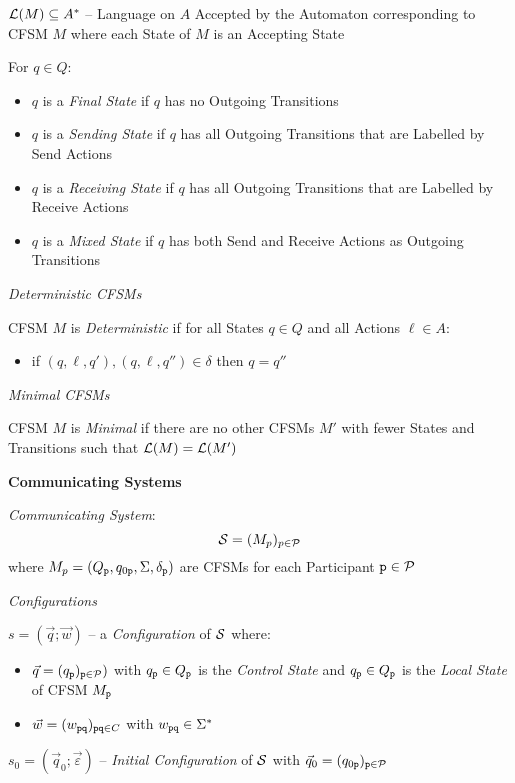 $\mathcal{L}(M) \subseteq A^*$ -- Language on $A$ Accepted by the
Automaton corresponding to CFSM $M$ where each State of $M$ is an
Accepting State %

For $q \in Q$:
\begin{itemize}
  \item $q$ is a \emph{Final State} if $q$ has no Outgoing Transitions
  \item $q$ is a \emph{Sending State} if $q$ has all Outgoing
    Transitions that are Labelled by Send Actions
  \item $q$ is a \emph{Receiving State} if $q$ has all Outgoing
    Transitions that are Labelled by Receive Actions
  \item $q$ is a \emph{Mixed State} if $q$ has both Send and
    Receive Actions as Outgoing Transitions
\end{itemize}

\emph{Deterministic CFSMs}

CFSM $M$ is \emph{Deterministic} if for all States $q \in Q$ and all
Actions $\ell \in A$:
\begin{itemize}
  \item if $(q,\ell,q'),(q,\ell,q'') \in \delta$ then $q = q''$
\end{itemize}

\emph{Minimal CFSMs}

CFSM $M$ is \emph{Minimal} if there are no other CFSMs $M'$ with fewer
States and Transitions such that $\mathcal{L}(M) = \mathcal{L}(M')$


\textbf{Communicating Systems}

\emph{Communicating System}:
\[
  \mathcal{S} = (M_p)_{p \in \mathcal{P}}
\]
where $M_p = (Q_\mathtt{p}, q_{0\mathtt{p}}, \Sigma, \delta_\mathtt{p})$
are CFSMs for each Participant $\mathtt{p} \in \mathcal{P}$

\emph{Configurations}

$s = (\vec{q};\vec{w})$ -- a \emph{Configuration} of $\mathcal{S}$
where:
\begin{itemize}
  \item $\vec{q} = (q_\mathtt{p})_{\mathtt{p} \in \mathcal{P}})$ with
    $q_\mathtt{p} \in Q_\mathtt{p}$ is the \emph{Control State} and
    $q_\mathtt{p} \in Q_\mathtt{p}$ is the \emph{Local State} of CFSM
    $M_\mathtt{p}$
  \item $\vec{w} = (w_\mathtt{pq})_{\mathtt{pq} \in C}$ with
    $w_\mathtt{pq} \in \Sigma^*$
\end{itemize}
$s_0 = (\vec{q}_0;\vec{\varepsilon})$ -- \emph{Initial Configuration}
of $\mathcal{S}$ with $\vec{q}_0 = (q_{0\mathtt{p}})_{\mathtt{p} \in
  \mathcal{P}}$

